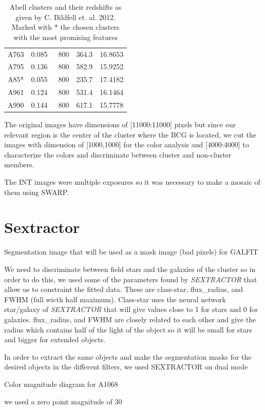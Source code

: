 \begin{table}[]
\begin{tabular}{ccccc}
A763    & 0.085 & ~800           & 364.3 & 16.8653   \\
A795    & 0.136 & ~800           & 582.9 & 15.9252   \\
A85*    & 0.055 & ~800           & 235.7 & 17.4182   \\
A961    & 0.124 & ~800           & 531.4 & 16.1464   \\
A990    & 0.144 & ~800           & 617.1 & 15.7778   
\end{tabular}
\caption[Abell Clusters and their redshift]{Abell clusters and their redshifts as given by C. Bildfell et. al. 2012. Marked with * the chosen clusters with the most promising features}
\end{table}

The original images have dimensions of [11000:11000] pixels but since our relevant region is the center of the cluster where the BCG is located, we cut the images with dimension of [1000,1000] for the color analysis and [4000:4000] to characterize the colors and discriminate between cluster and non-cluster members.

The INT images were multiple exposures so it was necessary to make a mosaic of them using SWARP.

\section{Sextractor}

Segmentation image that will be used as a mask image (bad pixels) for GALFIT

We need to discriminate between field stars and the galaxies of the cluster so in order to do this, we used some of the parameters found by \textit{SEXTRACTOR} that allow us to constraint the fitted data. These are class-star, flux\_radius, and FWHM (full wicth half maximum). Class-star uses the neural network star/galaxy of \textit{SEXTRACTOR} that will give values close to 1 for stars and 0 for galaxies. flux\_radius, and FWHM are closely related to each other and give the radius which contains half of the light of the object so it will be small for stars and bigger for extended objects.

In order to extract the same objects and make the segmentation masks for the desired objects in the different filters, we used SEXTRACTOR on dual mode

Color magnitude diagram for A1068

we used a zero point magnitude of 30

